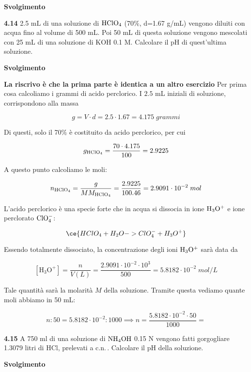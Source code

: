 \vspace{0.2cm}\large\textbf{Svolgimento}\normalsize

\vspace{0.2cm}

\vspace{0.2cm}\textbf{4.14} 2.5 mL di una soluzione di $\rm HClO_4$ (70\%, d=1.67 g/mL) vengono diluiti con acqua fino al
volume di 500 mL. Poi 50 mL di questa soluzione vengono mescolati con 25 mL di una soluzione di KOH 0.1 M. Calcolare il pH di quest’ultima soluzione.

\vspace{0.2cm}\large\textbf{Svolgimento}\normalsize

\vspace{0.2cm}\textbf{La riscrivo è che la prima parte è identica a un altro esercizio}
Per prima cosa calcoliamo i grammi di acido perclorico. I $2.5$ mL iniziali di soluzione, corrispondono alla massa

$$g=V \cdot d=2.5 \cdot 1.67=4.175\;grammi$$

Di questi, solo il 70\% è costituito da acido perclorico, per cui

$$g_{\rm HClO_4}=\frac{70 \cdot 4.175}{100}=2.9225$$

A questo punto calcoliamo le moli:

$$n_{\rm HClO_4}
=\frac{g}{MM_{\rm HClO_4}}
=\frac{2.9225}{100.46}=2.9091 \cdot 10^{-2}\;mol$$

L'acido perclorico è una specie forte che in acqua si dissocia in ione $\rm H_3O^+$ e ione perclorato $\rm ClO_4^-$:

$$\ce{HClO_4 + H_2O -> ClO_4^- + H_3O^+}$$

Essendo totalmente dissociato, la concentrazione degli ioni $\rm H_3O^+$ sarà data da

$$[\text{H}_3\text{O}^+]=\frac{n}{V(L)}=\frac{2.9091 \cdot 10^{-2} \cdot 10^{3}}{500}=5.8182 \cdot 10^{-2}\;mol/L$$

Tale quantità sarà la molarità $M$ della soluzione. Tramite questa vediamo quante moli abbiamo in 50 mL:

$$n:50=5.8182 \cdot 10^{-2}:1000
\implies
n=\frac{5.8182 \cdot 10^{-2} \cdot 50}{1000}=$$

\vspace{0.2cm}\textbf{4.15} A 750 ml di una soluzione di $\rm NH_4OH$ 0.15 N vengono fatti gorgogliare 1.3079 litri di HCl, prelevati a c.n.\,. Calcolare il pH della soluzione.

\vspace{0.2cm}\large\textbf{Svolgimento}\normalsize

